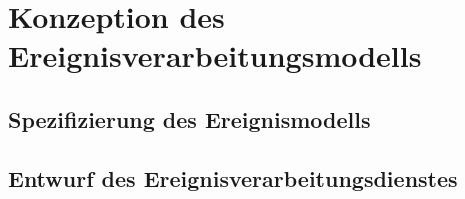 \section{Konzeption des Ereignisverarbeitungsmodells}

\subsection{Spezifizierung des Ereignismodells}



\subsection{Entwurf des Ereignisverarbeitungsdienstes}


